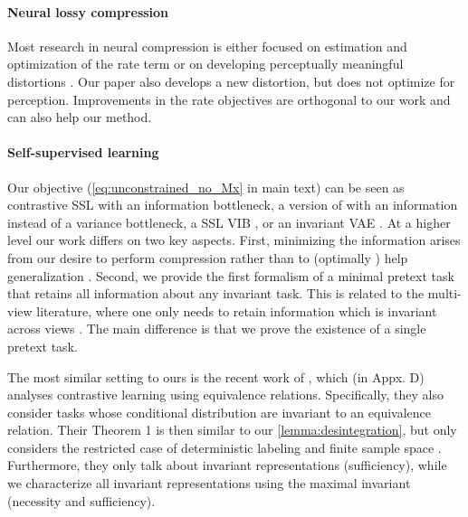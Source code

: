 \documentclass[final]{article}
\begin{document}
\paragraph{Neural lossy compression}
Most research in neural compression is either focused on estimation and optimization of the rate term \cite{chen_variational_2017,minnen_joint_2018,johnston_computationally_2019,yang_improving_2020,yang_variational_2020,minnen_channel-wise_2020,lee_context-adaptive_2019,agustsson_universally_2020} or on developing perceptually meaningful distortions \cite{blau_rethinking_2019,chen_perceptually_2020,agustsson_generative_2019,mentzer_high-fidelity_2020}.
Our paper also develops a new distortion, but does not optimize for perception.
Improvements in the rate objectives are orthogonal to our work and can also help our method.



\paragraph{Self-supervised learning}
Our objective (\cref{eq:unconstrained_no_Mx} in main text)  can be seen as contrastive SSL \cite{oord_representation_2019,chen_simple_2020} with an information bottleneck,
a version of \cite{zbontar_barlow_2021,bardes_vicreg_2021} with an information instead of a variance bottleneck,
a SSL VIB \cite{alemi_deep_2017}, or
an invariant VAE \cite{kingma_auto-encoding_2014}.
At a higher level our work differs on two key aspects.
First, minimizing the information  arises from our desire to perform compression rather than to (optimally \cite{dubois_learning_2020}) help generalization \cite{shamir_learning_2010,vera_role_2018}.
Second, we provide the first formalism of a minimal pretext task  that retains all information about any invariant task.
This is related to the multi-view literature, where one only needs to retain information which is invariant across views \cite{sridharan_information_2008,tosh_contrastive_2021,lee_predicting_2020,tsai_self-supervised_2021}.
The main difference is that we prove the existence of a single pretext task.

The most similar setting to ours is the recent work of \citet{mitrovic_representation_2021}, which (in Appx. D) analyses contrastive learning using equivalence relations. 
Specifically, they also consider tasks  whose conditional distribution are invariant to an equivalence relation.
Their Theorem 1 is then similar to our \cref{lemma:desintegration}, but only considers the restricted case of deterministic labeling and finite sample space . Furthermore, they only talk about invariant representations (sufficiency), while we characterize all invariant representations using the maximal invariant (necessity and sufficiency).
\end{document}

